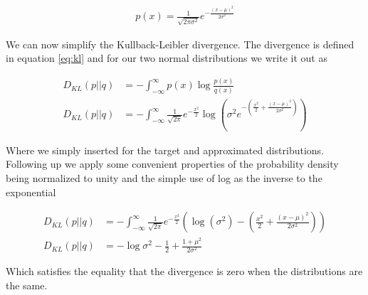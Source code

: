 \begin{align}
p(x) = \frac{1}{\sqrt{2\pi \sigma^2}}e^{-\frac{(x-\mu)^2}{2\sigma^2}}
\end{align}

\noindent We can now simplify the Kullback-Leibler divergence. The divergence is defined in equation \ref{eq:kl} and for our two normal distributions we write it out as 

\begin{align}
D_{KL}(p || q) &= - \int_{-\infty}^\infty p(x) \log \frac{p(x)}{q(x)} \\
D_{KL}(p || q) &= - \int_{-\infty}^\infty \frac{1}{\sqrt{2\pi }}e^{-\frac{x^2}{2}} \log\left(\sigma^2  e^{-(\frac{x^2}{2} + \frac{(x-\mu)^2}{2\sigma^2})}\right)
\end{align}

\noindent Where we simply inserted for the target and approximated distributions. Following up we apply some convenient properties of the probability density being normalized to unity and the simple use of log as the inverse to the exponential 

\begin{align}
D_{KL}(p || q) &= - \int_{-\infty}^\infty \frac{1}{\sqrt{2\pi }}e^{-\frac{x^2}{2}} \left(\log \left(\sigma^2 \right) -\left(\frac{x^2}{2} + \frac{(x-\mu)^2}{2\sigma^2} \right) \right) \\
D_{KL}(p || q) &= -\log \sigma^2 - \frac{1}{2} + \frac{1 + \mu^2}{2\sigma^2}
\end{align}

\noindent Which satisfies the equality that the divergence is zero when the distributions are the same.

